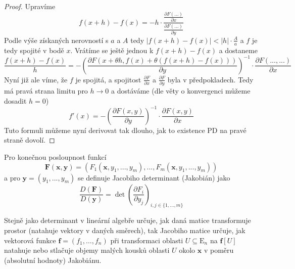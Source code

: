 \documentclass[../main.tex]{subfiles}
\begin{document}
\begin{proof}
	Upravíme
	$$
	f(x + h) - f(x) = -h \cdot
	\frac{\frac{\partial F(...)}{\partial x}}
	{\frac{\partial F(...)}{\partial y}}
	$$
	Podle výše získaných nerovností s $a$ a $A$ tedy $|f(x + h) - f(x)| <
	|h| \cdot \frac{A}{a}$ a $f$ je tedy spojité v bodě $x$. Vrátíme se
	ještě jednou k $f(x + h) - f(x)$ a dostaneme
	$$
	\frac{f(x + h) - f(x)}{h} = - \left ( \frac{\partial F (x + \theta h,
	f(x) + \theta (f(x + h) - f(x)))}{\partial y} \right)^{-1} \cdot
	\frac{\partial F(..., ...)}{\partial x}
	$$
	Nyní již ale víme, že $f$ je spojitá, a spojitost $\frac{\partial
	F}{\partial x}$ a $\frac{\partial F}{\partial y}$ byla v předpokladech.
	Tedy má pravá strana limitu pro $h \rightarrow 0$ a dostáváme
	(dle věty o konvergenci můžeme dosadit $h = 0$)
	$$
	f'(x) = - \left ( \frac{\partial F(x, y)}{\partial y} \right )^{-1}
	\cdot \frac{\partial F(x, y)}{\partial x}
	$$
	Tuto formuli můžeme nyní derivovat tak dlouho, jak to existence PD na
	pravé straně dovolí.
\end{proof}



\begin{definition}
	Pro konečnou posloupnost funkcí
	\[ \mathbf{F}(\mathbf{x}, \mathbf{y}) =
	(F_1(\mathbf{x}, y_1, ..., y_m), ... , F_m(\mathbf{x}, y_1, ..., y_m)) \]
	a pro $\mathbf{y} = (y_1, ... , y_m)$ se definuje Jacobiho determinant (Jakobián) jako
	\[ \frac{D(\mathbf{F})}{D(\mathbf{y})} =
	\det \left( \frac{\partial F_i}{\partial y_j} \right)_{i,j \in \{ 1, ... , m\}} \]
\end{definition}

\begin{intuition}
	Stejně jako determinant v lineární algebře určuje, jak daná matice transformuje prostor (natahuje vektory v daných směrech), tak Jacobiho matice určuje, jak vektorová funkce $\mathbf{f} = \left(f_1, \ldots, f_n\right)$ při transformaci oblasti $U \subseteq \mathrm{E}_n$ na $\mathbf{f}[U]$ natahuje nebo stlačuje objemy malých kousků oblasti $U$ okolo $\mathbf{x}$ v poměru (absolutní hodnoty) Jakobiánu.
\end{intuition}
\end{document}
